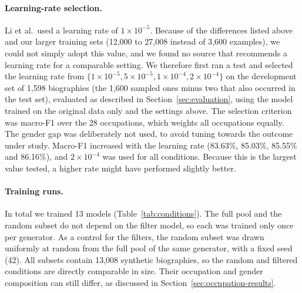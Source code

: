 \documentclass[sigconf]{acmart}
\begin{document}
\paragraph{Learning-rate selection.}
Li et al.\ used a learning rate of $1\times10^{-5}$. Because of the differences listed above and our larger training sets (12,000 to 27,008 instead of 3,600 examples), we could not simply adopt this value, and we found no source that recommends a learning rate for a comparable setting. We therefore first ran a test and selected the learning rate from $\{1\times10^{-5}, 5\times10^{-5}, 1\times10^{-4}, 2\times10^{-4}\}$ on the development set of 1,598 biographies (the 1,600 sampled ones minus two that also occurred in the test set), evaluated as described in Section~\ref{sec:evaluation}, using the model trained on the original data only and the settings above.
The selection criterion was macro-F1 over the 28 occupations, which weights all occupations equally. The gender gap was deliberately not used, to avoid tuning towards the outcome under study.
Macro-F1 increased with the learning rate (83.63\%, 85.03\%, 85.55\% and 86.16\%), and $2\times10^{-4}$ was used for all conditions. Because this is the largest value tested, a higher rate might have performed slightly better.

\paragraph{Training runs.}
In total we trained 13 models (Table~\ref{tab:conditions}). The full pool and the random subset do not depend on the filter model, so each was trained only once per generator.
As a control for the filters, the random subset was drawn uniformly at random from the full pool of the same generator, with a fixed seed (42). All subsets contain 13,008 synthetic biographies, so the random and filtered conditions are directly comparable in size. Their occupation and gender composition can still differ, as discussed in Section~\ref{sec:occupation-results}.
\end{document}
